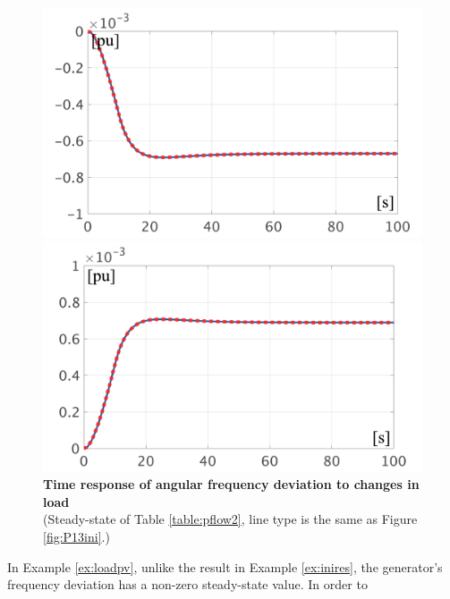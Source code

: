 \documentclass[graybox, envcountchap]{svmult}
\begin{document}
\begin{figure}[t]
  \centering
  {
  \begin{minipage}{0.49\linewidth}
    \centering
    \includegraphics[width = 1.0\linewidth]{figs/P3mi}
  \end{minipage}
  \begin{minipage}{0.49\linewidth}
    \centering
    \includegraphics[width = 1.0\linewidth]{figs/P3pl}
  \end{minipage}
  \medskip
  \caption{\textbf{Time response of angular frequency deviation to changes in load}
  \\ \centering(Steady-state of Table \ref{table:pflow2}, line type is the same
  as Figure \ref{fig:P13ini}.)}
  \label{fig:P3load}
  }
\medskip
\end{figure}
In Example \ref{ex:loadpv}, unlike the result in Example \ref{ex:inires}, the
generator's frequency deviation has a non-zero steady-state value. In order to
\end{document}
